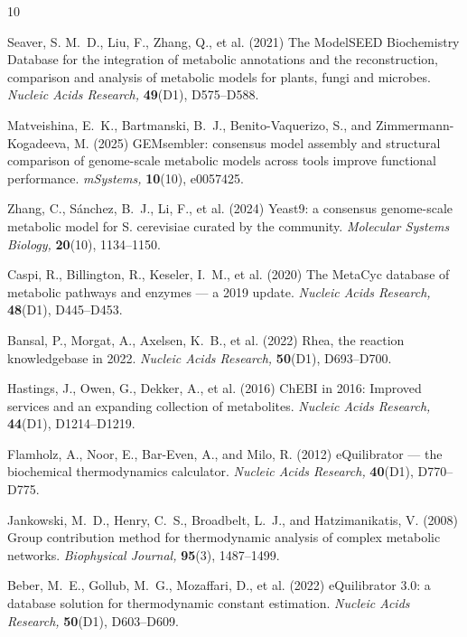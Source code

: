 \documentclass[unnumsec,webpdf,modern,large]{oup-authoring-template}
\begin{document}

\begin{thebibliography}{10}

Seaver, S. M.~D., Liu, F., Zhang, Q., et al. (2021)
The {ModelSEED} Biochemistry Database for the integration of metabolic
  annotations and the reconstruction, comparison and analysis of metabolic
  models for plants, fungi and microbes.
{\em Nucleic Acids Research,} {\bf 49}(D1), D575--D588.

Matveishina, E.~K., Bartmanski, B.~J., Benito-Vaquerizo, S., and
  Zimmermann-Kogadeeva, M. (2025)
{GEMsembler}: consensus model assembly and structural comparison of
  genome-scale metabolic models across tools improve functional performance.
{\em mSystems,} {\bf 10}(10), e0057425.

Zhang, C., S{\'a}nchez, B.~J., Li, F., et al. (2024)
{Yeast9}: a consensus genome-scale metabolic model for {S. cerevisiae} curated
  by the community.
{\em Molecular Systems Biology,} {\bf 20}(10), 1134--1150.

Caspi, R., Billington, R., Keseler, I.~M., et al. (2020)
The {MetaCyc} database of metabolic pathways and enzymes --- a 2019 update.
{\em Nucleic Acids Research,} {\bf 48}(D1), D445--D453.

Bansal, P., Morgat, A., Axelsen, K.~B., et al. (2022)
{Rhea}, the reaction knowledgebase in 2022.
{\em Nucleic Acids Research,} {\bf 50}(D1), D693--D700.

Hastings, J., Owen, G., Dekker, A., et al. (2016)
{ChEBI} in 2016: Improved services and an expanding collection of metabolites.
{\em Nucleic Acids Research,} {\bf 44}(D1), D1214--D1219.

Flamholz, A., Noor, E., Bar-Even, A., and Milo, R. (2012)
{eQuilibrator} --- the biochemical thermodynamics calculator.
{\em Nucleic Acids Research,} {\bf 40}(D1), D770--D775.

Jankowski, M.~D., Henry, C.~S., Broadbelt, L.~J., and Hatzimanikatis, V. (2008)
Group contribution method for thermodynamic analysis of complex metabolic
  networks.
{\em Biophysical Journal,} {\bf 95}(3), 1487--1499.

Beber, M.~E., Gollub, M.~G., Mozaffari, D., et al. (2022)
{eQuilibrator} 3.0: a database solution for thermodynamic constant estimation.
{\em Nucleic Acids Research,} {\bf 50}(D1), D603--D609.


\end{thebibliography}
\end{document}
